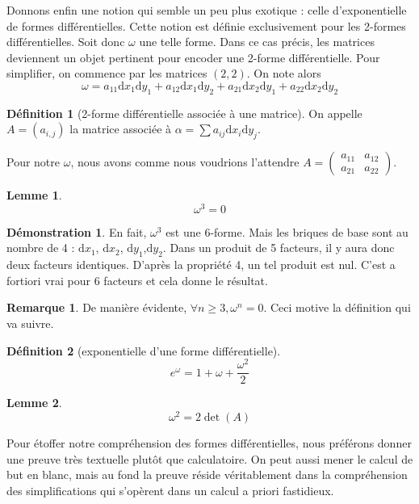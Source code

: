 \documentclass{article}
\theoremstyle{definition} %
\newtheorem{defi}{Définition}
\newtheorem{rmq}{Remarque}
\newtheorem{lem}{Lemme}
\newtheorem{dem}{Démonstration}
\newcommand{\dd}{ \mathrm{d}}
\newcommand{\1}{\mathbb{1}} %
\begin{document}
Donnons enfin une notion qui semble un peu plus exotique : celle d'exponentielle de formes différentielles.
Cette notion est définie exclusivement pour les 2-formes différentielles.
Soit donc $\omega$ une telle forme.
Dans ce cas précis, les matrices deviennent un objet pertinent pour encoder une 2-forme différentielle.
Pour simplifier, on commence par les matrices $(2,2)$.
On note alors
$$\omega = a_{11} \dd x_1 \dd y_1 + a_{12} \dd x_1 \dd y_2 + a_{21} \dd x_2 \dd y_1 + a_{22} \dd x_2 \dd y_2$$


\begin{defi}[2-forme différentielle associée à une matrice]
On appelle $A=(a_{i,j})$ la matrice associée à $\alpha = \sum a_{ij} \dd x_i \dd y_j$.
\end{defi}

Pour notre $\omega$, nous avons comme nous voudrions l'attendre $A = \begin{pmatrix} a_{11} & a_{12} \\ a_{21} & a_{22}
\end{pmatrix}$.

\begin{lem}
$$\omega^3 = 0$$
\end{lem}


\begin{dem}
En fait, $\omega^3$ est une 6-forme. Mais les briques de base sont au nombre de 4 : $\dd x_1$, $\dd x_2$, $\dd y_1$,$\dd y_2$.
Dans un produit de 5 facteurs, il y aura donc deux facteurs identiques. D'après la propriété 4, un tel produit est nul.
C'est a fortiori vrai pour 6 facteurs et cela donne le résultat.
\end{dem}

\begin{rmq}
De manière évidente, $\forall n \geq 3, \omega^n=0$. Ceci motive la définition qui va suivre.
\end{rmq}

\begin{defi}[exponentielle d'une forme différentielle]
$$e^\omega = 1 + \omega + \frac{\omega^2}{2}$$
\end{defi}

\begin{lem}
$$\omega^2=2  \det(A)$$
\end{lem}
    
Pour étoffer notre compréhension des formes différentielles, nous préférons donner une preuve très textuelle plutôt que calculatoire. On peut aussi mener le calcul de but en blanc, mais au fond la preuve réside véritablement dans la compréhension des simplifications qui s'opèrent dans un calcul a priori fastidieux.
    
\end{document}
